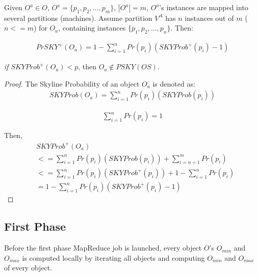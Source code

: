 \vspace{5 mm}

\begin{lemma}
\label{lemma:3}
Given $O^a \in O$, $O^a=\{p_1, p_2, \dots, p_m\}$, $|O^a| = m$, $O^a$'s instances are mapped into several partitions (machines). Assume partition $V^A$ has $n$ instances out of $m$ ($n<=m$) for $O_a$, containing instances $\{p_1, p_2, \dots, p_n\}$. Then:

\begin{equation}
\label{objectUpper}
    \begin{aligned}
PrSKY^{+}(O_a) = 1 - \sum\limits_{i=1}^n Pr(p_i)(SKYProb^+(p_i)-1)
    \end{aligned}
\end{equation}

\emph{if} $SKYProb^{+}(O_a) < p$, then $O_a \notin PSKY(OS)$.

\end{lemma}

\begin{proof}
The Skyline Probability of an object $O_a$ is denoted as:
\begin{equation}
    \begin{aligned}
SKYProb(O_a) = \sum\limits_{i=1}^n Pr(p_i)(SKYProb(p_i))
    \end{aligned}
\end{equation}

\begin{equation}
    \begin{aligned}
\sum\limits_{i=1}^n Pr(p_i) = 1
    \end{aligned}
\end{equation}

Then, 
\begin{equation}
    \begin{aligned}
& SKYProb^{+}(O_a) \\
& <= \sum\limits_{i=1}^n Pr(p_i)(SKYProb(p_i)) +
\sum\limits_{i=n+1}^m Pr(p_i) \\
& <= \sum\limits_{i=1}^n Pr(p_i)(SKYProb^+(p_i)) +
1 - \sum\limits_{i=1}^n Pr(p_i) \\
& = 1 - \sum\limits_{i=1}^n Pr(p_i)(SKYProb^+(p_i)-1)
    \end{aligned}
\end{equation}
\end{proof}


\subsection{First Phase}
\label{firstPhase}
Before the first phase MapReduce job is launched, every object $O$'s $O_{min}$ and $O_{max}$ is computed locally by iterating all objects and computing $O_{min}$ and $O_{max}$ of every object.

